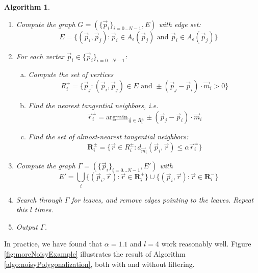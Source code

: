 \documentclass{article}
\newtheorem{algo}{Algorithm}
\numberwithin{cntr}{section}
\numberwithin{equation}{section}
\newcommand{\vp}[0]{{\vec{p}}}
\newcommand{\vq}[0]{{\vec{q}}}
\newcommand{\vr}[0]{{\vec{r}}}
\newcommand{\vm}[0]{{\vec{m}}}
\newcommand{\OtoN}{{0 \ldots N-1}}
\newcommand{\pointData}{{ \{ \vp_{i} \}_{i=\OtoN} }}
\newcommand{\allowed}[2]{ { A_{#1}(#2) } }
\begin{document}
\begin{algo}
  \begin{enumerate}
  \item Compute the graph $G = (\pointData, E)$ with edge set:
    \begin{equation*}
      E = \{ (\vp_{i},\vp_{j}) : \vp_{i} \in \allowed{\epsilon}{\vp_{j}} \textrm{~and~} \vp_{i} \in \allowed{\epsilon}{\vp_{j}}\}
    \end{equation*}
  \item For each vertex $\vp_{i} \in \pointData$:
    \begin{enumerate}[a.]
    \item Compute the set of vertices
      \begin{equation*}
        R^{\pm}_{i} = \{ \vp_{j} : (\vp_{i}, \vp_{j}) \in E \textrm{~and~} \pm (\vp_{j}-\vp_{i}) \cdot \vm_{i} > 0 \}
      \end{equation*}
    \item Find the nearest tangential neighbors, i.e.
      \begin{equation*}
        \vr^{\pm}_{i} = \textrm{argmin}_{\vq \in R^{\pm}_{i}} \pm (\vp_{j}-\vp_{i}) \cdot \vm_{i}
      \end{equation*}
    \item Find the set of almost-nearest tangential neighbors:
      \begin{equation*}
        \mathbf{R}^{\pm}_{i} = \{ \vr \in R^{\pm}_{i} : d_{\vm_{i}}(\vp_{i}, \vr) \leq \alpha \vr^{\pm}_{i} \}
      \end{equation*}
    \end{enumerate}
  \item Compute the graph $\Gamma = ( \pointData, E')$ with
    \begin{equation*}
      E' = \bigcup_{i} \{ (\vp_{i}, \vr) : \vr \in \mathbf{R}^{+}_{i} \} \cup \{ (\vp_{i}, \vr) : \vr \in \mathbf{R}^{-}_{i} \}
    \end{equation*}
  \item Search through $\Gamma$ for leaves, and remove edges pointing to the leaves. Repeat this $l$ times.
  \item Output $\Gamma$.
  \end{enumerate}
\end{algo}

In practice, we have found that $\alpha=1.1$ and
$l=4$ work reasonably well.
Figure \ref{fig:moreNoisyExample} illustrates the result of Algorithm
\ref{algo:noisyPolygonalization}, both with and without filtering.
\end{document}
